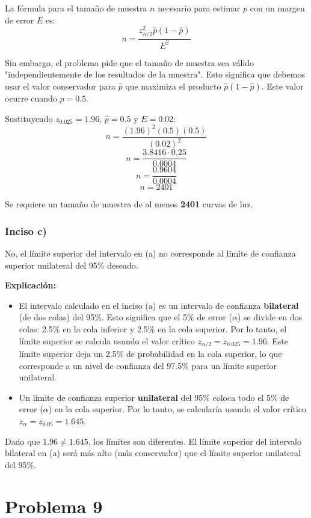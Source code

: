 \documentclass[12pt]{article}
\begin{document}
La fórmula para el tamaño de muestra $n$ necesario para estimar $p$ con un margen de error $E$ es:
$$ n = \frac{z_{\alpha/2}^2 \hat{p}(1-\hat{p})}{E^2} $$

Sin embargo, el problema pide que el tamaño de muestra sea válido "independientemente de los resultados de la muestra". Esto significa que debemos usar el valor conservador para $\hat{p}$ que maximiza el producto $\hat{p}(1-\hat{p})$. Este valor ocurre cuando $\hat{p} = 0.5$.

Sustituyendo $z_{0.025} = 1.96$, $\hat{p} = 0.5$ y $E = 0.02$:
$$ n = \frac{(1.96)^2 (0.5)(0.5)}{(0.02)^2} $$
$$ n = \frac{3.8416 \cdot 0.25}{0.0004} $$
$$ n = \frac{0.9604}{0.0004} $$
$$ n = 2401 $$

Se requiere un tamaño de muestra de al menos \textbf{2401} curvas de luz.

\subsubsection{Inciso c)}
No, el límite superior del intervalo en (a) no corresponde al límite de confianza superior unilateral del 95\% deseado.

\textbf{Explicación:}
\begin{itemize}
    \item El intervalo calculado en el inciso (a) es un intervalo de confianza \textbf{bilateral} (de dos colas) del 95\%. Esto significa que el 5\% de error ($\alpha$) se divide en dos colas: 2.5\% en la cola inferior y 2.5\% en la cola superior. Por lo tanto, el límite superior se calcula usando el valor crítico $z_{\alpha/2} = z_{0.025} = 1.96$. Este límite superior deja un 2.5\% de probabilidad en la cola superior, lo que corresponde a un nivel de confianza del 97.5\% para un límite superior unilateral.
    \item Un límite de confianza superior \textbf{unilateral} del 95\% coloca todo el 5\% de error ($\alpha$) en la cola superior. Por lo tanto, se calcularía usando el valor crítico $z_{\alpha} = z_{0.05} = 1.645$.
\end{itemize}

Dado que $1.96 \neq 1.645$, los límites son diferentes. El límite superior del intervalo bilateral en (a) será más alto (más conservador) que el límite superior unilateral del 95\%.


\section{Problema 9}
\end{document}
